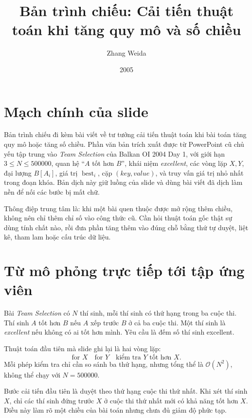 \documentclass[11pt]{article}
\title{Bản trình chiếu: Cải tiến thuật toán khi tăng quy mô và số chiều}
\author{Zhang Weida}
\date{2005}
\newcommand{\Oh}{\mathcal{O}}
\begin{document}
\maketitle


\section{Mạch chính của slide}

Bản trình chiếu đi kèm bài viết về tư tưởng cải tiến thuật toán khi bài toán
tăng quy mô hoặc tăng số chiều. Phần văn bản trích xuất được từ PowerPoint cũ
chủ yếu tập trung vào \textit{Team Selection} của Balkan OI 2004 Day 1, với
giới hạn \(3\le N\le 500000\), quan hệ ``\(A\) tốt hơn \(B\)'', khái niệm
\textit{excellent}, các vòng lặp \(X,Y\), đại lượng \(B[A_i]\), giá trị
\(\operatorname{best}_i\), cặp \((\mathit{key},\mathit{value})\), và truy vấn
giá trị nhỏ nhất trong đoạn khóa. Bản dịch này giữ luồng của slide và dùng
bài viết đã dịch làm nền để nối các bước bị mất chữ.

Thông điệp trung tâm là: khi một bài quen thuộc được mở rộng thêm chiều, không
nên chỉ thêm chỉ số vào công thức cũ. Cần hỏi thuật toán gốc thật sự dùng tính
chất nào, rồi đưa phần tăng thêm vào đúng chỗ bằng thứ tự duyệt, liệt kê,
tham lam hoặc cấu trúc dữ liệu.

\section{Từ mô phỏng trực tiếp tới tập ứng viên}

Bài \textit{Team Selection} có \(N\) thí sinh, mỗi thí sinh có thứ hạng trong
ba cuộc thi. Thí sinh \(A\) tốt hơn \(B\) nếu \(A\) xếp trước \(B\) ở cả ba
cuộc thi. Một thí sinh là \textit{excellent} nếu không có ai tốt hơn mình.
Yêu cầu là đếm số thí sinh excellent.

Thuật toán đầu tiên mà slide ghi lại là hai vòng lặp:
\[
  \text{for }X\quad \text{for }Y\quad \text{kiểm tra }Y\text{ tốt hơn }X.
\]
Mỗi phép kiểm tra chỉ cần so sánh ba thứ hạng, nhưng tổng thể là
\(\Oh(N^2)\), không thể chạy với \(N=500000\).

Bước cải tiến đầu tiên là duyệt theo thứ hạng cuộc thi thứ nhất. Khi xét
thí sinh \(X\), chỉ các thí sinh đứng trước \(X\) ở cuộc thi thứ nhất mới có
khả năng tốt hơn \(X\). Điều này làm rõ một chiều của bài toán nhưng chưa đủ
giảm độ phức tạp.
\end{document}
